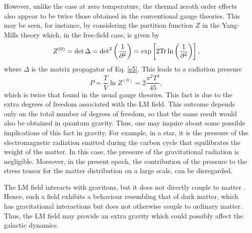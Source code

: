 \documentclass[longbibliography,groupedaddress,showpacs,showkeys,amssymb,eqsecnum,aps,nofootinbib,superscriptaddress]{revtex4}
\newcommand{\be}{\begin{equation}}
\newcommand{\ee}{\end{equation}}
\begin{document}
However,  unlike the case at zero temperature,  the thermal 
zeroth order effects 
also appear to be twice those obtained in the conventional
gauge theories. This may be seen, for instance, by considering the
partition function $Z$ in the Yang-Mills theory which, in the free-field
case, is given by \cite{lebellac:book96} %
\be
Z^{(0)} = \det\Delta = {\det}^2\left(\frac{1}{\partial^2}\right)=
\exp\left[2  {\rm Tr} \ln\left(\frac{1}{\partial^2}\right)\right],
\ee
where
$\Delta$ is the matrix propagator of Eq. \eqref{e5}. This leads to a
radiation pressure
\be
P = \frac{T}{V} \ln Z^{(0)}  = 2 \frac{\pi^2 T^4}{45},
\ee %
which is twice that found in the usual gauge theories. 
This fact is due to the extra degrees of freedom associated with the
LM field. This outcome depends only on the total number of degrees of
freedom, so that the same result would also be obtained in quantum gravity. 
Thus, one may inquire about some possible implications of this fact in
gravity. For example,  in a star,  it is the pressure of the
electromagnetic radiation emitted during the carbon cycle that
equilibrates the weight of the matter.  In this case,  the pressure of
the gravitational radiation is negligible.  Moreover, %
in the present epoch,
the contribution of the pressure to the stress tensor for the matter
distribution on a large scale, can be %
disregarded.

The LM field interacts with gravitons, but it does not directly couple
to matter \cite{Brandt:2021ycu}.  
Hence, such a field exhibits a %
behaviour resembling that of dark matter,
which has gravitational interactions but does not otherwise couple to %
ordinary matter. Thus, 
the LM field may provide an extra gravity which
could possibly affect the galactic dynamics.
\end{document}
